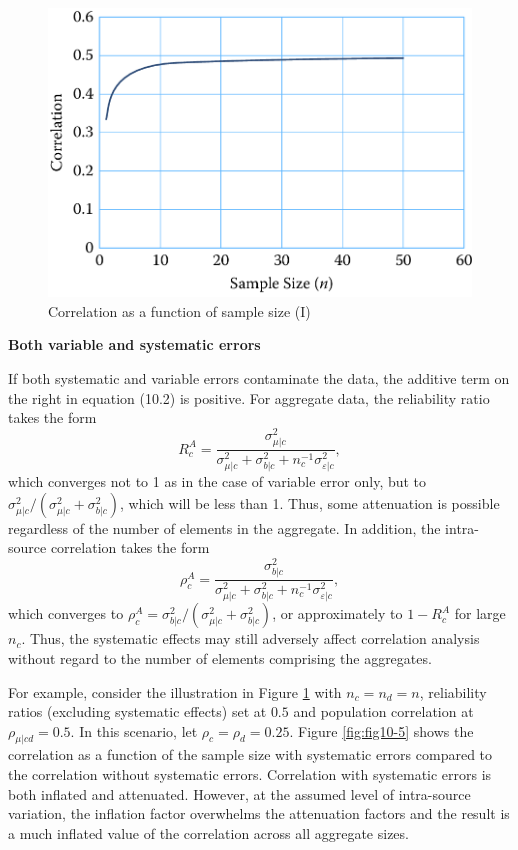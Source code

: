 \documentclass[]{krantz}
\begin{document}
\begin{figure}

{\centering \includegraphics[width=0.7\linewidth]{ChapterError/figures/fig10-4} 

}

\caption{Correlation as a function of sample size (I)}\label{fig:fig10-4}
\end{figure}

\textbf{Both variable and systematic errors}

If both systematic and variable errors contaminate the data, the
additive term on the right in equation (10.2) is positive. For aggregate
data, the reliability ratio takes the form \[\label{eq:10-1.8}
R_c^A = \frac{{\sigma_{\mu |c}^2}}{{\sigma_{\mu |c}^2 + \sigma
_{b|c}^2 + n_c^{ - 1}\sigma_{\varepsilon |c}^2}},\] which converges not
to 1 as in the case of variable error only, but to
\(\sigma_{\mu \vert c}^2 / (\sigma_{\mu \vert c}^2 + \sigma_{b\vert c}^2)\),
which will be less than 1. Thus, some attenuation is possible regardless
of the number of elements in the aggregate. In addition, the
intra-source correlation takes the form \[\label{eq:10-1.9}
\rho_c^A = \frac{{\sigma_{b|c}^2}}{{\sigma_{\mu |c}^2 +
\sigma_{b|c}^2 + n_c^{ - 1}\sigma_{\varepsilon |c}^2}},\] which
converges to
\(\rho_c^A = \sigma_{b|c}^2/(\sigma_{\mu |c}^2 + \sigma _{b|c}^2)\), or
approximately to \(1 - R_c^A\) for large \(n_c\). Thus, the systematic
effects may still adversely affect correlation analysis without regard
to the number of elements comprising the aggregates.

For example, consider the illustration in Figure \ref{fig:fig10-4} with
\(n_c = n_d = n\), reliability ratios (excluding systematic effects) set
at \(0.5\) and population correlation at \(\rho_{\mu \vert cd} = 0.5\).
In this scenario, let \(\rho_c = \rho_d = 0.25\). Figure
\ref{fig:fig10-5} shows the correlation as a function of the sample size
with systematic errors compared to the correlation without systematic
errors. Correlation with systematic errors is both inflated and
attenuated. However, at the assumed level of intra-source variation, the
inflation factor overwhelms the attenuation factors and the result is a
much inflated value of the correlation across all aggregate sizes.
\end{document}
